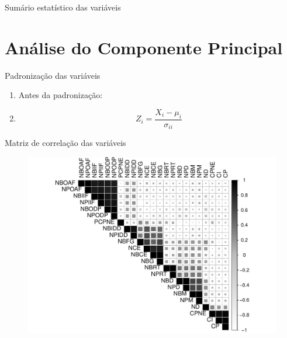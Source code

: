 \documentclass{beamer}
\begin{document}
	\begin{frame}{Sumário estatístico das variáveis}
		
	\end{frame}

\section{Análise do Componente Principal}

\begin{frame}{Padronização das variáveis}
	\begin{enumerate}
	\item Antes da padronização:
	
	\item $$Z_{i}=\dfrac{X_{i}-\mu_{i}}{\sigma_{ii}}$$
	\end{enumerate}
\end{frame}

\begin{frame}{Matriz de correlação das variáveis}
	\begin{figure}[H]
			\centering
			\includegraphics[scale=.5]{../graficos/latex-graph-matriz-correlacao}
	\end{figure}
\end{frame}
\end{document}
